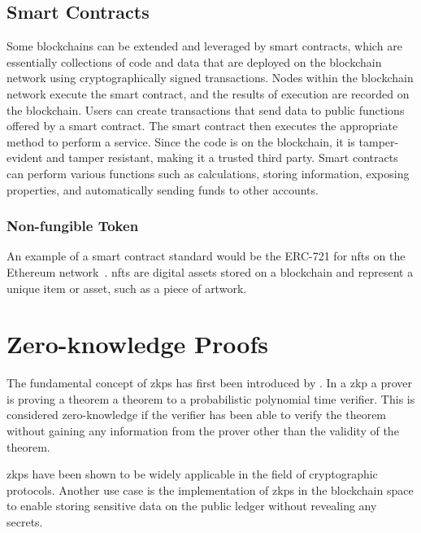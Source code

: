 \subsection{Smart Contracts}
Some blockchains can be extended and leveraged by smart contracts, which are essentially collections of code and data that are deployed on the blockchain network using cryptographically signed transactions. Nodes within the blockchain network execute the smart contract, and the results of execution are recorded on the blockchain. Users can create transactions that send data to public functions offered by a smart contract. The smart contract then executes the appropriate method to perform a service. Since the code is on the blockchain, it is tamper-evident and tamper resistant, making it a trusted third party. Smart contracts can perform various functions such as calculations, storing information, exposing properties, and automatically sending funds to other accounts. \parencite{blockchainoverview}

\subsubsection{Non-fungible Token}
An example of a smart contract standard would be the ERC-721 for \glspl{nft} on the Ethereum network~\cite{erc721}. \glspl{nft} are digital assets stored on a blockchain and represent a unique item or asset, such as a piece of artwork. 

\section{Zero-knowledge Proofs}
The fundamental concept of \glspl{zkp} has first been introduced by \textcite{goldwasserzkp}. In a \gls{zkp} a prover is proving a theorem a theorem to a probabilistic polynomial time verifier. \cite{zkpdefinitions} This is considered zero-knowledge if the verifier has been able to verify the theorem without gaining any information from the prover other than the validity of the theorem.

\glspl{zkp} have been shown to be widely applicable in the field of cryptographic protocols. \cite{zkpexamples} Another use case is the implementation of \glspl{zkp} in the blockchain space to enable storing sensitive data on the public ledger without revealing any secrets.

